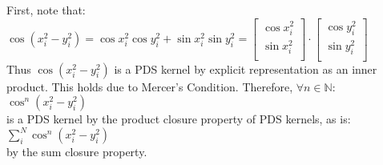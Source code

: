 \documentclass[]{article}
\begin{document}
\subsection{}


\pagebreak

\section{}

\pagebreak

\section{}

\subsection{}

First, note that:\\ $\cos(x_i^2-y_i^2) = \cos x_i^2 \cos y_i^2 + \sin x_i^2 \sin y_i^2 
= \left[
\begin{array}{c}
\cos x_i^2\\
\sin x_i^2\\
\end{array}
\right]
\cdot
\left[
\begin{array}{c}
\cos y_i^2\\
\sin y_i^2\\
\end{array}
\right]$\\

Thus $\cos(x_i^2-y_i^2)$ is a PDS kernel by explicit representation as an inner product. This holds due to Mercer's Condition. Therefore, $\forall n \in \mathbb{N}$:\\

 $\cos^n(x_i^2-y_i^2)$\\
 
 \noindent is a PDS kernel by the product closure property of PDS kernels, as is:\\
 
 $\sum_{i}^{N} \cos^n(x_i^2-y_i^2)$\\
 
 \noindent by the sum closure property.
 
 \subsection{}
\end{document}
